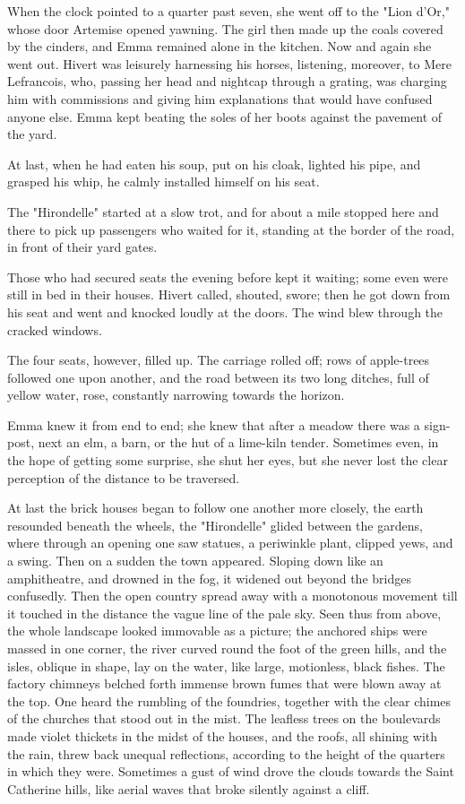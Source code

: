 \documentclass[11pt,twocolumn]{ltugboat}
\begin{document}
When the clock pointed to a quarter past seven, she went off to the
"Lion d'Or," whose door Artemise opened yawning. The girl then made
up the coals covered by the cinders, and Emma remained alone in the
kitchen. Now and again she went out. Hivert was leisurely harnessing his
horses, listening, moreover, to Mere Lefrancois, who, passing her head
and nightcap through a grating, was charging him with commissions and
giving him explanations that would have confused anyone else. Emma kept
beating the soles of her boots against the pavement of the yard.

At last, when he had eaten his soup, put on his cloak, lighted his pipe,
and grasped his whip, he calmly installed himself on his seat.

The "Hirondelle" started at a slow trot, and for about a mile stopped
here and there to pick up passengers who waited for it, standing at the
border of the road, in front of their yard gates.

Those who had secured seats the evening before kept it waiting; some
even were still in bed in their houses. Hivert called, shouted, swore;
then he got down from his seat and went and knocked loudly at the doors.
The wind blew through the cracked windows.

The four seats, however, filled up. The carriage rolled off; rows of
apple-trees followed one upon another, and the road between its two long
ditches, full of yellow water, rose, constantly narrowing towards the
horizon.

Emma knew it from end to end; she knew that after a meadow there was
a sign-post, next an elm, a barn, or the hut of a lime-kiln tender.
Sometimes even, in the hope of getting some surprise, she shut her eyes,
but she never lost the clear perception of the distance to be traversed.

At last the brick houses began to follow one another more closely, the
earth resounded beneath the wheels, the "Hirondelle" glided between the
gardens, where through an opening one saw statues, a periwinkle plant,
clipped yews, and a swing. Then on a sudden the town appeared. Sloping
down like an amphitheatre, and drowned in the fog, it widened out
beyond the bridges confusedly. Then the open country spread away with
a monotonous movement till it touched in the distance the vague line of
the pale sky. Seen thus from above, the whole landscape looked immovable
as a picture; the anchored ships were massed in one corner, the river
curved round the foot of the green hills, and the isles, oblique in
shape, lay on the water, like large, motionless, black fishes. The
factory chimneys belched forth immense brown fumes that were blown away
at the top. One heard the rumbling of the foundries, together with the
clear chimes of the churches that stood out in the mist. The leafless
trees on the boulevards made violet thickets in the midst of the
houses, and the roofs, all shining with the rain, threw back unequal
reflections, according to the height of the quarters in which they were.
Sometimes a gust of wind drove the clouds towards the Saint Catherine
hills, like aerial waves that broke silently against a cliff.
\end{document}
